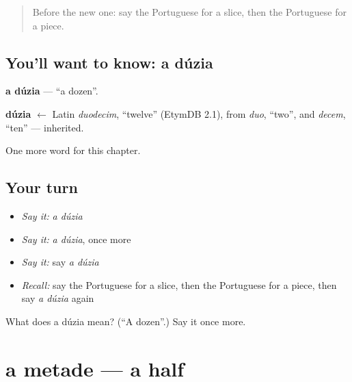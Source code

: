 \label{lesson:PT-C228-duzia}



\begin{quote}
Before the new one: say the Portuguese for a slice, then the Portuguese for a piece.
\end{quote}

\subsection*{You'll want to know: a dúzia}
\textbf{a dúzia} — \textquotedblleft{}a dozen\textquotedblright{}.

\begin{cousinweb}
\textbf{dúzia} $\leftarrow$ Latin \emph{duodecim}, \textquotedblleft{}twelve\textquotedblright{} (EtymDB 2.1), from \emph{duo}, \textquotedblleft{}two\textquotedblright{}, and \emph{decem}, \textquotedblleft{}ten\textquotedblright{} — inherited.
\end{cousinweb}

\begin{grammarlens}[title={What you've built}]
One more word for this chapter.
\end{grammarlens}

\subsection*{Your turn}
\begin{itemize}
\raggedright
  \item \emph{Say it:} \emph{a dúzia}
  \item \emph{Say it:} \emph{a dúzia}, once more
  \item \emph{Say it:} say \emph{a dúzia}
  \item \emph{Recall:} say the Portuguese for a slice, then the Portuguese for a piece, then say \emph{a dúzia} again
\end{itemize}

\begin{tcolorbox}[breakable,colback=teal!4,colframe=teal!35!black,title={Before you move on}]
What does a dúzia mean? (\textquotedblleft{}A dozen\textquotedblright{}.) Say it once more.
\end{tcolorbox}
\section[a metade]{a metade — a half}

\label{lesson:PT-C228-metade}



